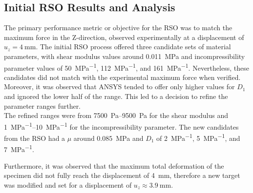 \subsection*{Initial RSO Results and Analysis}
The primary performance metric or objective for the RSO was to match the maximum force in the Z-direction, 
observed experimentally at a displacement of $u_z=\SI{4}{\milli\meter}$.
The initial RSO process offered three candidate sets of material parameters, with shear modulus values 
around \SI{0.011}{\mega \pascal} and incompressibility parameter values of \SI{50}{\mega\pascal\tothe{-1}}, 
\SI{112}{\mega\pascal\tothe{-1}}, and \SI{161}{\mega\pascal\tothe{-1}}. Nevertheless, these candidates 
did not match with the experimental maximum force when verified. Moreover, it was observed that ANSYS 
tended to offer only higher values for $D_1$ and ignored the lower half of the range. This led to a decision to 
refine the parameter ranges further.\\

The refined ranges were from \SIrange{7500}{9500}{\pascal} for the shear modulus and 
\SIrange{1}{10}{\mega\pascal\tothe{-1}} for the incompressibility parameter. The new candidates from the RSO had a 
$\mu$ around \SI{0.085}{\mega \pascal} and $D_1$ of \SI{2}{\mega\pascal\tothe{-1}}, 
\SI{5}{\mega\pascal\tothe{-1}}, and \SI{7}{\mega\pascal\tothe{-1}}. 

Furthermore, it was observed that the maximum total deformation of the specimen did not fully reach the  
displacement of \SI{4}{\milli\meter}, therefore a new target was modified and set for a displacement 
of $u_z\approx\SI{3.9}{\milli\meter}$.

